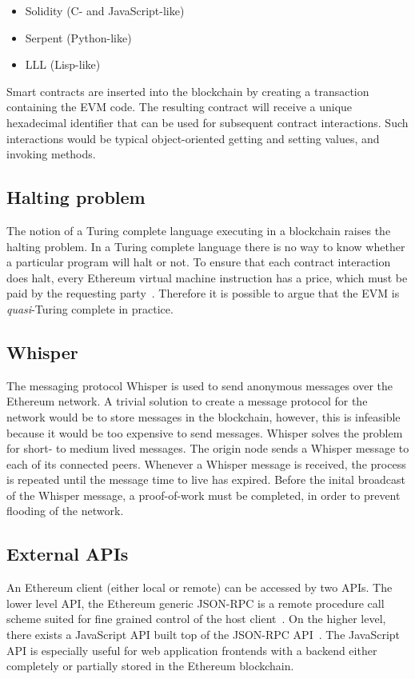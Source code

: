 \begin{itemize}
    \item Solidity (C- and JavaScript-like)
    \item Serpent (Python-like)
    \item LLL (Lisp-like)
\end{itemize}

Smart contracts are inserted into the blockchain by creating a transaction containing the EVM code. The resulting contract will receive a unique hexadecimal identifier that can be used for subsequent contract interactions. Such interactions would be typical object-oriented getting and setting values, and invoking methods.

\subsection{Halting problem}
The notion of a Turing complete language executing in a blockchain raises the halting problem. In a Turing complete language there is no way to know whether a particular program will halt or not. To ensure that each contract interaction does halt, every Ethereum virtual machine instruction has a price, which must be paid by the requesting party~\cite{ethereum:yellow}. Therefore it is possible to argue that the EVM is \emph{quasi}-Turing complete in practice.

\subsection{Whisper}
The messaging protocol Whisper is used to send anonymous messages over the Ethereum network. A trivial solution to create a message protocol for the network would be to store messages in the blockchain, however, this is infeasible because it would be too expensive to send messages. Whisper solves the problem for short- to medium lived messages. The origin node sends a Whisper message to each of its connected peers. Whenever a Whisper message is received, the process is repeated until the message time to live has expired. Before the inital broadcast of the Whisper message, a proof-of-work must be completed, in order to prevent flooding of the network.

\subsection{External APIs}
An Ethereum client (either local or remote) can be accessed by two APIs. The lower level API, the Ethereum generic JSON-RPC is a remote procedure call scheme suited for fine grained control of the host client~\cite{generic-json-rpc}. On the higher level, there exists a JavaScript API built top of the JSON-RPC API~\cite{javascript-api}. The JavaScript API is especially useful for web application frontends with a backend either completely or partially stored in the Ethereum blockchain.

